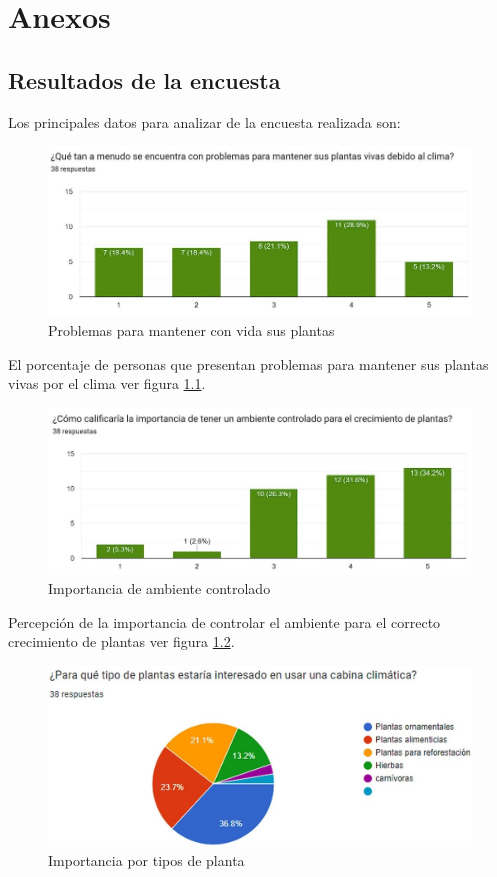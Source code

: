 \chapter{Anexos}
\section{Resultados de la encuesta}
Los principales datos para analizar de la encuesta realizada son:

\begin{figure}[H]
    \centering	
    \includegraphics[width=.8\textwidth]{img/Empresa/encuesta1.jpg} 
    \caption{Problemas para mantener con vida sus plantas}
\label{fig:encuesta1}
\end{figure}

El porcentaje de personas que presentan problemas para mantener sus plantas vivas por el clima ver figura \ref{fig:encuesta1}.

\begin{figure}[H]
    \centering	
    \includegraphics[width=.8\textwidth]{img/Empresa/encuesta2.jpg} 
    \caption{Importancia de ambiente controlado}
\label{fig:encuesta2}
\end{figure}

Percepción de la importancia de controlar el ambiente para el correcto crecimiento de plantas ver figura \ref{fig:encuesta2}.

\begin{figure}[H]
    \centering	
    \includegraphics[width=.8\textwidth]{img/Empresa/encuesta3.jpg} 
    \caption{Importancia por tipos de planta}
\label{fig:encuesta3}
\end{figure}

